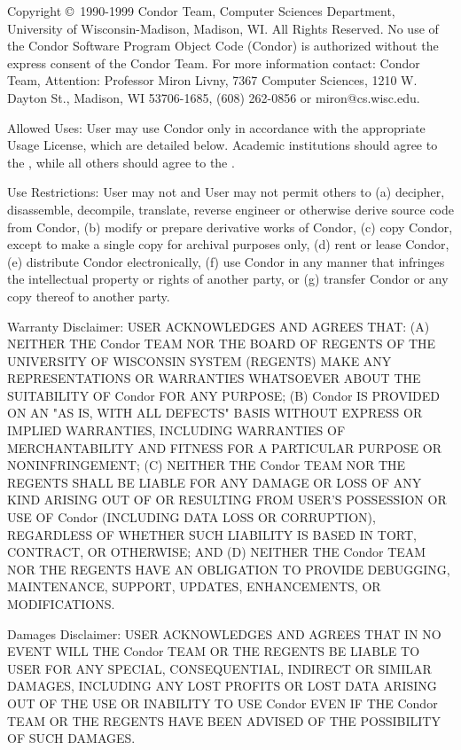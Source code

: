 Copyright \copyright\ 1990-1999 Condor Team, Computer Sciences
Department, University of Wisconsin-Madison, Madison, WI. All Rights
Reserved. No use of the Condor Software Program Object Code (Condor)
is authorized without the express consent of the Condor Team. For more
information contact: Condor Team, Attention: Professor Miron Livny,
7367 Computer Sciences, 1210 W. Dayton St., Madison, WI 53706-1685,
(608) 262-0856 or miron@cs.wisc.edu. 

Allowed Uses: User may use Condor only in accordance with the
appropriate Usage License, which are detailed below.  Academic
institutions should agree to the , while all others should agree to the .

Use Restrictions: User may not and User may not permit others to (a)
decipher, disassemble, decompile, translate, reverse engineer or
otherwise derive source code from Condor, (b) modify or prepare
derivative works of Condor, (c) copy Condor, except to make a single
copy for archival purposes only, (d) rent or lease Condor, (e)
distribute Condor electronically, (f) use Condor in any manner that
infringes the intellectual property or rights of another party, or (g)
transfer Condor or any copy thereof to another party. 

Warranty Disclaimer: USER ACKNOWLEDGES AND AGREES THAT: (A) NEITHER
THE Condor TEAM NOR THE BOARD OF REGENTS OF THE UNIVERSITY OF
WISCONSIN SYSTEM (REGENTS) MAKE ANY REPRESENTATIONS OR WARRANTIES
WHATSOEVER ABOUT THE SUITABILITY OF Condor FOR ANY PURPOSE; (B) Condor
IS PROVIDED ON AN "AS IS, WITH ALL DEFECTS" BASIS WITHOUT EXPRESS OR
IMPLIED WARRANTIES, INCLUDING WARRANTIES OF MERCHANTABILITY AND
FITNESS FOR A PARTICULAR PURPOSE OR NONINFRINGEMENT; (C) NEITHER THE
Condor TEAM NOR THE REGENTS SHALL BE LIABLE FOR ANY DAMAGE OR LOSS OF
ANY KIND ARISING OUT OF OR RESULTING FROM USER'S POSSESSION OR USE
OF Condor (INCLUDING DATA LOSS OR CORRUPTION), REGARDLESS OF WHETHER
SUCH LIABILITY IS BASED IN TORT, CONTRACT, OR OTHERWISE; AND (D)
NEITHER THE Condor TEAM NOR THE REGENTS HAVE AN OBLIGATION TO PROVIDE
DEBUGGING, MAINTENANCE, SUPPORT, UPDATES, ENHANCEMENTS, OR
MODIFICATIONS. 

Damages Disclaimer: USER ACKNOWLEDGES AND AGREES THAT IN NO EVENT WILL
THE Condor TEAM OR THE REGENTS BE LIABLE TO USER FOR ANY SPECIAL,
CONSEQUENTIAL, INDIRECT OR SIMILAR DAMAGES, INCLUDING ANY LOST PROFITS
OR LOST DATA ARISING OUT OF THE USE OR INABILITY TO USE Condor EVEN IF
THE Condor TEAM OR THE REGENTS HAVE BEEN ADVISED OF THE POSSIBILITY OF
SUCH DAMAGES. 

